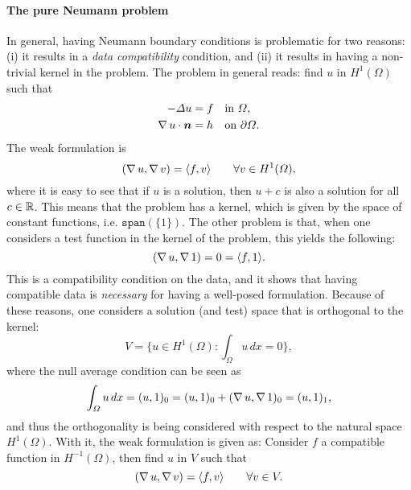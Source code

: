 \paragraph{The pure Neumann problem} In general, having Neumann boundary conditions is problematic for two reasons: (i) it results in a \emph{data compatibility} condition, and (ii) it results in having a non-trivial kernel in the problem. The problem in general reads: find $u$ in $H^1(\Omega)$ such that
\begin{equation}
    \begin{aligned}
        -\Delta u &= f && \text{in $\Omega$},\\
        \grad u \cdot \vec n &= h && \text{on $\partial\Omega$}.
    \end{aligned}
\end{equation}
The weak formulation is 
\begin{equation}
    (\operatorname{\nabla} u, \operatorname{\nabla} v) = \langle f, v \rangle \qquad \forall v\in H^1(\Omega),
\end{equation}
where it is easy to see that if $u$ is a solution, then $u+c$ is also a solution for all $c\in \mathbb{R}$. This means that the problem has a kernel, which is given by the space of constant functions, i.e. $\texttt{span}(\{1\})$. The other problem is that, when one considers a test function in the kernel of the problem, this yields the following: 
\begin{equation}
    (\operatorname{\nabla} u, \operatorname{\nabla} 1) = 0 = \langle f, 1\rangle.
\end{equation}
This is a compatibility condition on the data, and it shows that having compatible data is \emph{necessary} for having a well-posed formulation. Because of these reasons, one considers a solution (and test) space that is orthogonal to the kernel: 
\begin{equation}
    V = \{u\in H^1(\Omega): \int_\Omega u \,dx = 0\},
\end{equation}
where the null average condition can be seen as 
\begin{equation}
    \int_\Omega u \,dx = (u, 1)_0 = (u,1)_0 + (\operatorname{\nabla} u, \operatorname{\nabla} 1)_0 = (u, 1)_1,
\end{equation}
and thus the orthogonality is being considered with respect to the natural space $H^1(\Omega)$. With it, the weak formulation is given as: Consider $f$ a compatible function in $H^{-1}(\Omega)$, then find $u$ in $V$ such that
\begin{equation}
    (\operatorname{\nabla} u, \operatorname{\nabla} v) = \langle f, v\rangle \qquad \forall v\in V.
\end{equation}